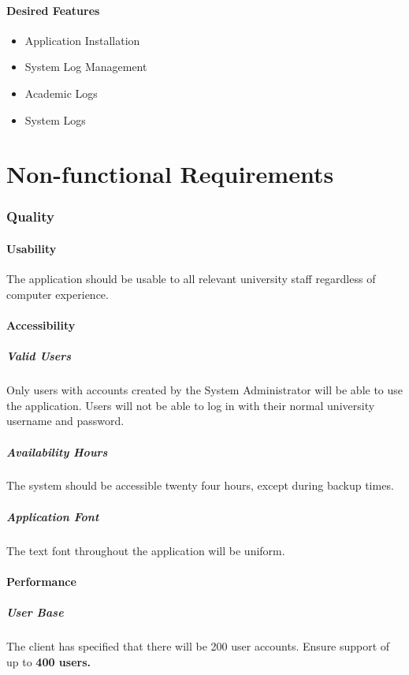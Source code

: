 \documentclass{article}
\begin{document}
\subsection{Desired Features}
\begin{itemize}
  \item Application Installation
  \item System Log Management
  \item Academic Logs
  \item System Logs
\end{itemize}

\part{Non-functional Requirements}
\section{Quality}
\subsection{Usability}
The application should be usable to all relevant university staff
regardless of computer experience.
\subsection{Accessibility}
\subsubsection{Valid Users}
Only users with accounts created by the System Administrator will be able to use
the application. Users will not be able to log in with their normal
university username and password.
\subsubsection{Availability Hours}
The system should be accessible twenty four hours, except during backup times.
\subsubsection{Application Font}
The text font throughout the application will be uniform.
\subsection{Performance}
\subsubsection{User Base}
The client has specified that there will be 200 user accounts. Ensure
support of up to \textbf{400 users.}
\end{document}
